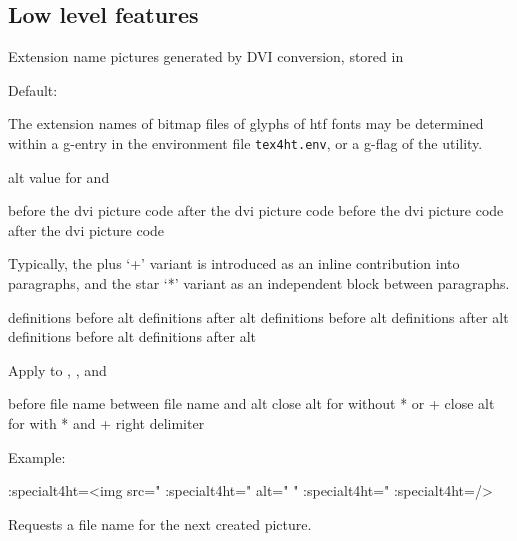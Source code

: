 \subsection{Low level features}

 {Extension name pictures generated by DVI conversion, stored in }\EndDoc

Default: 

\begin{texsource}
\end{texsource}

  The extension names of bitmap files of glyphs of htf fonts may be
  determined within a g-entry in the environment file \texttt{tex4ht.env}, or a
  g-flag of the  utility.

 {alt value for   and }\EndDoc


 {before the dvi picture code} {after the dvi picture code}\EndDoc
{} {before the dvi picture code} {after the dvi picture code}\EndDoc

  Typically, the plus `+' variant is introduced as an inline
  contribution into paragraphs, and the star `*' variant as an
  independent block between paragraphs.

 {definitions before alt} {definitions after alt}\EndDoc
{} {definitions before alt} {definitions after alt}\EndDoc
{} {definitions before alt} {definitions after alt}\EndDoc

Apply to , , and 


{before file name}
{between file name and alt}
{close alt for   without * or +}
{close alt for   with * and +}
{right delimiter}\EndDoc

  Example:

\begin{texsource}
  {\ht:special{t4ht=<img src="}}
  {\ht:special{t4ht=" alt="}}
  {" }
  {\ht:special{t4ht=" }}
  {\ht:special{t4ht=/>}}
\end{texsource}


   Requests a file name for the next created picture.


